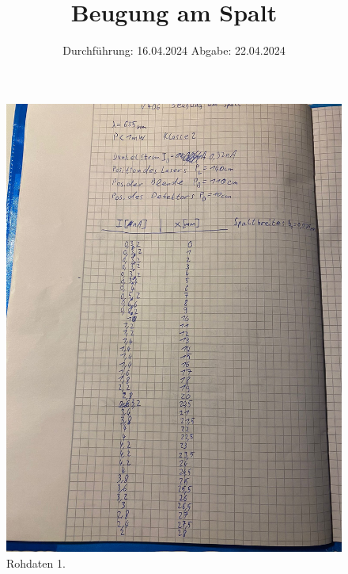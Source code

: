 

\subject{V406}
\title{Beugung am Spalt}
\date{%
  Durchführung: 16.04.2024
  \hspace{3em}
  Abgabe: 22.04.2024
}



\maketitle
\thispagestyle{empty}
\tableofcontents
\newpage






\printbibliography{}

\begin{figure}[H]
  \includegraphics[width=\textwidth, height=15cm]{Bilder/rohdaten1.JPG}
  \caption{Rohdaten 1.}
\end{figure}

